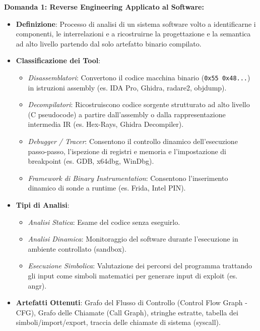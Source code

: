 \documentclass[11pt,a4paper]{article}
\begin{document}
\begin{solutionbox}
\textbf{Domanda 1: Reverse Engineering Applicato al Software:}
\begin{itemize}
    \item \textbf{Definizione}: Processo di analisi di un sistema software volto a identificarne i componenti, le interrelazioni e a ricostruirne la progettazione e la semantica ad alto livello partendo dal solo artefatto binario compilato.
    \item \textbf{Classificazione dei Tool}:
    \begin{itemize}
        \item \textit{Disassemblatori}: Convertono il codice macchina binario (\texttt{0x55 0x48...}) in istruzioni assembly (es. IDA Pro, Ghidra, radare2, objdump).
        \item \textit{Decompilatori}: Ricostruiscono codice sorgente strutturato ad alto livello (C pseudocode) a partire dall'assembly o dalla rappresentazione intermedia IR (es. Hex-Rays, Ghidra Decompiler).
        \item \textit{Debugger / Tracer}: Consentono il controllo dinamico dell'esecuzione passo-passo, l'ispezione di registri e memoria e l'impostazione di breakpoint (es. GDB, x64dbg, WinDbg).
        \item \textit{Framework di Binary Instrumentation}: Consentono l'inserimento dinamico di sonde a runtime (es. Frida, Intel PIN).
    \end{itemize}
    \item \textbf{Tipi di Analisi}:
    \begin{itemize}
        \item \textit{Analisi Statica}: Esame del codice senza eseguirlo.
        \item \textit{Analisi Dinamica}: Monitoraggio del software durante l'esecuzione in ambiente controllato (sandbox).
        \item \textit{Esecuzione Simbolica}: Valutazione dei percorsi del programma trattando gli input come simboli matematici per generare input di exploit (es. angr).
    \end{itemize}
    \item \textbf{Artefatti Ottenuti}: Grafo del Flusso di Controllo (Control Flow Graph - CFG), Grafo delle Chiamate (Call Graph), stringhe estratte, tabella dei simboli/import/export, traccia delle chiamate di sistema (syscall).
\end{itemize}


\end{solutionbox}
\end{document}
